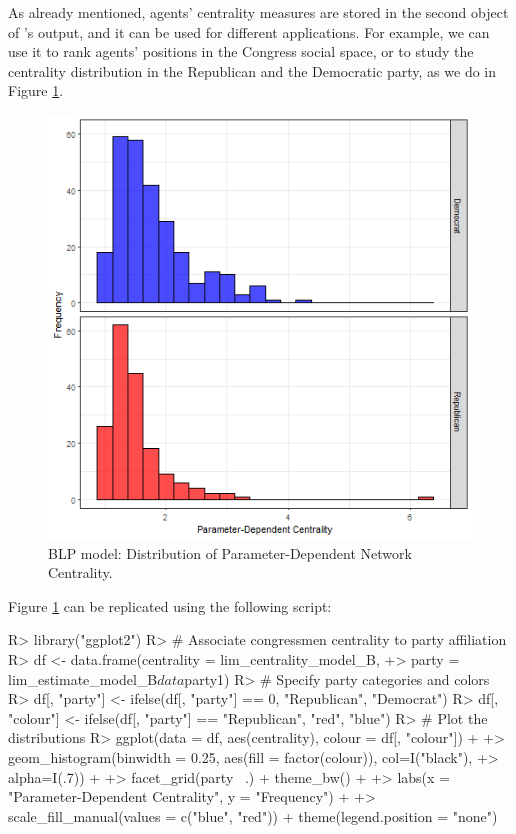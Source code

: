 \documentclass[nojss]{jss}
\begin{document}
As already mentioned, agents' centrality measures are stored in the second object of 's output, and it can be used for different applications. For example, we can use it to rank agents' positions in the Congress social space, or to study the centrality distribution in the Republican and the Democratic party, as we do in Figure \ref{fig:figure1}. 
\begin{figure}[t!]
\centering
\includegraphics{Figure1}
\caption{\label{fig:figure1} BLP model: Distribution of Parameter-Dependent Network Centrality.}
\end{figure}
Figure \ref{fig:figure1} can be replicated using the following script:
\begin{CodeChunk}
\begin{CodeInput}
R> library("ggplot2")
R> # Associate congressmen centrality to party affiliation
R> df <- data.frame(centrality = lim_centrality_model_B,
+> party = lim_estimate_model_B$data$party1)
R> # Specify party categories and colors
R> df[, "party"] <- ifelse(df[, "party"] == 0, "Republican", "Democrat")
R> df[, "colour"] <- ifelse(df[, "party"] == "Republican", "red", "blue")
R> # Plot the distributions
R> ggplot(data = df, aes(centrality), colour = df[, "colour"]) + 
+> geom_histogram(binwidth = 0.25, aes(fill = factor(colour)), col=I("black"),
+> alpha=I(.7)) +
+> facet_grid(party ~.) + theme_bw() + 
+> labs(x = "Parameter-Dependent Centrality", y = "Frequency") +
+> scale_fill_manual(values = c("blue", "red")) + theme(legend.position = "none")
\end{CodeInput}
\end{CodeChunk}
\end{document}
